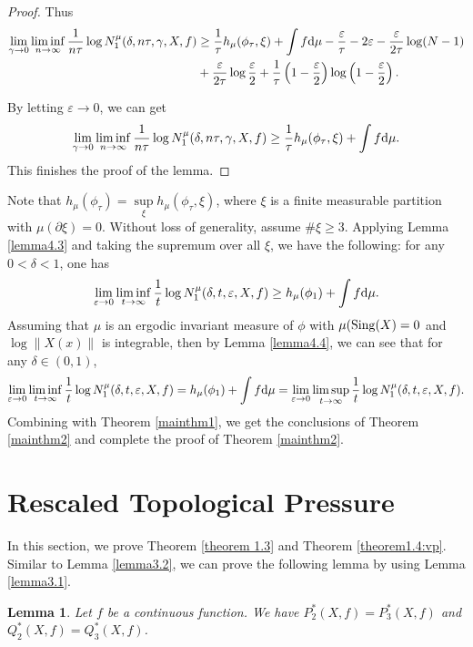\documentclass[10pt]{article}
\newtheorem*{Theorem A}{Theorem A}
\newtheorem{Lemma}[Theorem]{Lemma}
\begin{document}
\begin{proof}
\noindent
Thus
\[
\begin{aligned}
\lim_{\gamma\to 0} \liminf_{n \to \infty} \frac{1}{n\tau} \log N_1^\mu(\delta, n\tau, \gamma, X, f) &\geq \frac{1}{\tau} h_\mu(\phi_\tau, \xi) + \int f {\rm d}\mu - \frac{\varepsilon}{\tau} - 2\varepsilon -\frac{\varepsilon}{2\tau} \log(N - 1) \\
&+ \frac{\varepsilon}{2\tau} \log \frac{\varepsilon}{2} +\frac{1}{\tau} \left( 1 - \frac{\varepsilon}{2} \right) \log \left( 1 - \frac{\varepsilon}{2} \right).
\end{aligned}
\]

\noindent
By letting \( \varepsilon \to 0 \), we can get
\[
\lim_{\gamma\to 0} \liminf_{n \to \infty} \frac{1}{n\tau} \log N_1^\mu(\delta, n\tau, \gamma, X, f) \geq \frac{1}{\tau} h_\mu(\phi_\tau, \xi) + \int f {\rm d}\mu.
\]
This finishes the proof of the lemma.
\end{proof}

Note that \( h_\mu(\phi_\tau) = \sup\limits_\xi h_\mu(\phi_\tau, \xi) \), where \( \xi \) is a finite measurable partition with \( \mu(\partial \xi) = 0 \). Without loss of generality, assume \( \#\xi \geq 3 \). Applying Lemma \ref{lemma4.3} and taking the supremum over all \( \xi \), we have the following: for any \( 0 < \delta < 1 \), one has
\[
\lim_{\varepsilon \to 0} \liminf_{t \to \infty} \frac{1}{t} \log N_1^\mu(\delta, t, \varepsilon, X, f) \geq h_\mu(\phi_1) + \int f {\rm d}\mu.
\]
Assuming that $\mu$ is an ergodic invariant measure of $\phi$ with $\mu({\rm Sing}(X)=0$ and $\log\|X(x)\|$ is integrable, then by Lemma \ref{lemma4.4}, we can see that for any $\delta\in(0,1)$,
\[
\lim_{\varepsilon \to 0} \liminf_{t \to \infty} \frac{1}{t} \log N_1^\mu(\delta, t, \varepsilon, X, f) = h_\mu(\phi_1) + \int f {\rm d}\mu=\lim_{\varepsilon \to 0} \limsup_{t \to \infty} \frac{1}{t} \log N_1^\mu(\delta, t, \varepsilon, X, f).
\]
Combining with Theorem \ref{mainthm1}, we get the conclusions of Theorem \ref{mainthm2} and complete the proof of Theorem \ref{mainthm2}.

\section{Rescaled Topological Pressure }\label{sec:tp}
In this section, we prove Theorem \ref{theorem 1.3} and Theorem \ref{theorem1.4:vp}. Similar to Lemma \ref{lemma3.2}, we can prove the following lemma by using Lemma \ref{lemma3.1}.

\begin{Lemma}\label{lemma5.1}
Let $f$ be a continuous function. We have $P_2^*(X, f)=P_3^*(X, f)$ and $Q_2^*(X, f)=Q_3^*(X ,f)$.
\end{Lemma}
\end{document}
